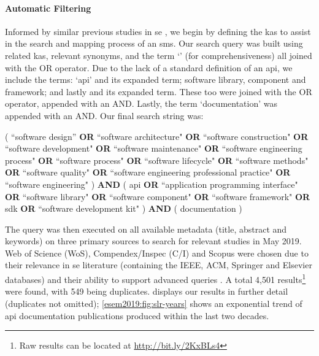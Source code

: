 \paragraph{Automatic Filtering}

Informed by similar previous studies in \gls{se}  \citep{Glass:2002wa,Usman:2017hn,GAROUSI2019101}, we begin by defining the  \citep{IEEE:1990wp} \glspl{ka} to assist in the search and mapping process of an \gls{sms}. Our search query was built using related \glspl{ka}, relevant synonyms, and the term `' (for comprehensiveness) all joined with the OR operator. Due to the lack of a standard definition of an \gls{api}, we include the terms: `\gls{api}' and its expanded term; software library, component and framework; and lastly  and its expanded term. These too were joined with the OR operator, appended with an AND. Lastly, the term `documentation' was appended with an AND.
Our final search string was:
\begin{framed}
\noindent
\parbox{\linewidth}{
\footnotesize
( ``software design'' \textbf{OR} ``software architecture" \textbf{OR} ``software construction" \textbf{OR} ``software development" \textbf{OR} ``software maintenance" \textbf{OR} ``software engineering process" \textbf{OR} ``software process" \textbf{OR} ``software lifecycle" \textbf{OR} ``software methods" \textbf{OR} ``software quality" \textbf{OR} ``software engineering professional practice" \textbf{OR} ``software engineering" ) \textbf{AND} ( \gls{api} \textbf{OR} ``application programming interface" \textbf{OR} ``software library" \textbf{OR} ``software component" \textbf{OR} ``software framework" \textbf{OR} sdk \textbf{OR} ``software development kit" ) \textbf{AND} ( documentation )
}
\end{framed}

The query was then executed on all available metadata (title, abstract and keywords) on three primary sources to search for relevant studies in May 2019. Web of Science  (WoS), Compendex/Inspec (C/I) and Scopus were chosen due to their relevance in \gls{se} literature (containing the IEEE, ACM, Springer and Elsevier databases) and their ability to support advanced queries \citep{Brereton:2007by,Kitchenham:2007dd}. A total 4,501 results\footnote{Raw results can be located at \url{http://bit.ly/2KxBLs4}} were found, with 549 being duplicates.  displays our results in further detail (duplicates not omitted); \cref{esem2019:fig:slr-years} shows an exponential trend of \gls{api} documentation publications produced within the last two decades.

